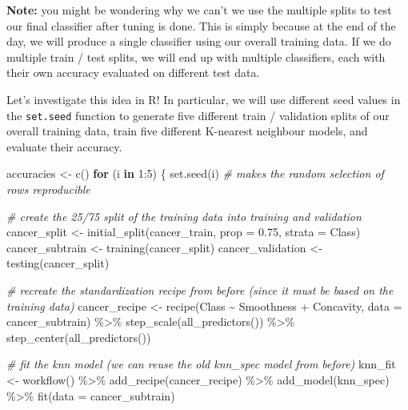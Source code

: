 \documentclass[
]{krantz}
\makeatletter
\newenvironment{Shaded}{\begin{snugshade}}{\end{snugshade}}
\newcommand{\AttributeTok}[1]{\textcolor[rgb]{0.61,0.61,0.61}{#1}}
\newcommand{\CommentTok}[1]{\textcolor[rgb]{0.37,0.37,0.37}{\textit{#1}}}
\newcommand{\ControlFlowTok}[1]{\textcolor[rgb]{0.27,0.27,0.27}{\textbf{#1}}}
\newcommand{\DecValTok}[1]{\textcolor[rgb]{0.06,0.06,0.06}{#1}}
\newcommand{\FloatTok}[1]{\textcolor[rgb]{0.06,0.06,0.06}{#1}}
\newcommand{\FunctionTok}[1]{\textcolor[rgb]{0,0,0}{#1}}
\newcommand{\NormalTok}[1]{#1}
\newcommand{\OtherTok}[1]{\textcolor[rgb]{0.37,0.37,0.37}{#1}}
\newcommand{\SpecialCharTok}[1]{\textcolor[rgb]{0,0,0}{#1}}
\renewenvironment{quote}{\begin{VF}}{\end{VF}}
\newenvironment{kframe}{%
\medskip{}
\setlength{\fboxsep}{.8em}
 \def\at@end@of@kframe{}%
 \ifinner\ifhmode%
  \def\at@end@of@kframe{\end{minipage}}%
  \begin{minipage}{\columnwidth}%
 \fi\fi%
 \def\FrameCommand##1{\hskip\@totalleftmargin \hskip-\fboxsep
 \colorbox{shadecolor}{##1}\hskip-\fboxsep
     \hskip-\linewidth \hskip-\@totalleftmargin \hskip\columnwidth}%
 \MakeFramed {\advance\hsize-\width
   \@totalleftmargin\z@ \linewidth\hsize
   \@setminipage}}%
 {\par\unskip\endMakeFramed%
 \at@end@of@kframe}
\renewenvironment{Shaded}{\begin{kframe}}{\end{kframe}}
\makeatother
\begin{document}
\begin{quote}
\textbf{Note:} you might be wondering why we can't we use the multiple splits to test our final classifier after tuning is done. This is simply
because at the end of the day, we will produce a single classifier using our overall training data. If we do multiple train / test splits, we will
end up with multiple classifiers, each with their own accuracy evaluated on different test data.
\end{quote}

Let's investigate this idea in R! In particular, we will use different seed
values in the \texttt{set.seed} function to generate five different train / validation
splits of our overall training data, train five different K-nearest neighbour
models, and evaluate their accuracy.

\begin{Shaded}
\begin{Highlighting}[]
\NormalTok{accuracies }\OtherTok{\textless{}{-}} \FunctionTok{c}\NormalTok{()}
\ControlFlowTok{for}\NormalTok{ (i }\ControlFlowTok{in} \DecValTok{1}\SpecialCharTok{:}\DecValTok{5}\NormalTok{) \{}
  \FunctionTok{set.seed}\NormalTok{(i) }\CommentTok{\# makes the random selection of rows reproducible}

  \CommentTok{\# create the 25/75 split of the training data into training and validation}
\NormalTok{  cancer\_split }\OtherTok{\textless{}{-}} \FunctionTok{initial\_split}\NormalTok{(cancer\_train, }\AttributeTok{prop =} \FloatTok{0.75}\NormalTok{, }\AttributeTok{strata =}\NormalTok{ Class)}
\NormalTok{  cancer\_subtrain }\OtherTok{\textless{}{-}} \FunctionTok{training}\NormalTok{(cancer\_split)}
\NormalTok{  cancer\_validation }\OtherTok{\textless{}{-}} \FunctionTok{testing}\NormalTok{(cancer\_split)}

  \CommentTok{\# recreate the standardization recipe from before (since it must be based on the training data)}
\NormalTok{  cancer\_recipe }\OtherTok{\textless{}{-}} \FunctionTok{recipe}\NormalTok{(Class }\SpecialCharTok{\textasciitilde{}}\NormalTok{ Smoothness }\SpecialCharTok{+}\NormalTok{ Concavity, }\AttributeTok{data =}\NormalTok{ cancer\_subtrain) }\SpecialCharTok{\%\textgreater{}\%}
    \FunctionTok{step\_scale}\NormalTok{(}\FunctionTok{all\_predictors}\NormalTok{()) }\SpecialCharTok{\%\textgreater{}\%}
    \FunctionTok{step\_center}\NormalTok{(}\FunctionTok{all\_predictors}\NormalTok{())}

  \CommentTok{\# fit the knn model (we can reuse the old knn\_spec model from before)}
\NormalTok{  knn\_fit }\OtherTok{\textless{}{-}} \FunctionTok{workflow}\NormalTok{() }\SpecialCharTok{\%\textgreater{}\%}
    \FunctionTok{add\_recipe}\NormalTok{(cancer\_recipe) }\SpecialCharTok{\%\textgreater{}\%}
    \FunctionTok{add\_model}\NormalTok{(knn\_spec) }\SpecialCharTok{\%\textgreater{}\%}
    \FunctionTok{fit}\NormalTok{(}\AttributeTok{data =}\NormalTok{ cancer\_subtrain)}


\end{Highlighting}
\end{Shaded}
\end{document}
